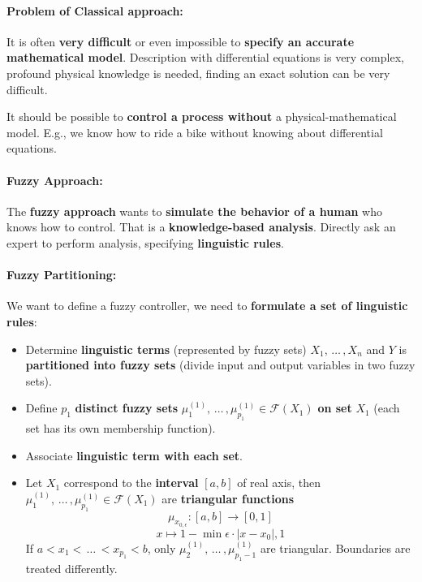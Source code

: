 \paragraph{Problem of Classical approach:} It is often \textbf{very difficult} or even impossible to \textbf{specify an accurate mathematical model}. Description with differential equations is very complex, profound physical knowledge is needed, finding an exact solution can be very difficult.

It should be possible to \textbf{control a process without} a physical-mathematical model. E.g., we know how to ride a bike without knowing about differential equations.\\

\paragraph{Fuzzy Approach:} The \textbf{fuzzy approach} wants to \textbf{simulate the behavior of a human} who knows how to control. That is a \textbf{knowledge-based analysis}. Directly ask an expert to perform analysis, specifying \textbf{linguistic rules}. \\

\paragraph{Fuzzy Partitioning:} We want to define a fuzzy controller, we need to \textbf{formulate a set of linguistic rules}: 
\begin{itemize}
	\item Determine \textbf{linguistic terms} (represented by fuzzy sets) $X_1, \, \dots \, , X_n$ and $Y$ is \textbf{partitioned into fuzzy sets} (divide input and output variables in two fuzzy sets).\\
	
	\item Define $p_1$ \textbf{distinct fuzzy sets} $\mu_1^{(1)}, \, \dots \, , \mu_{p_1}^{(1)} \in \mathcal{F}(X_1)$ \textbf{on set} $X_1$ (each set has its own membership function).\\
	
	\item Associate \textbf{linguistic term with each set}.\\
	
	\item Let $X_1$ correspond to the \textbf{interval} $[a,b]$ of real axis, then $\mu_1^{(1)}, \, \dots \, , \mu_{p_1}^{(1)} \in \mathcal{F} (X_1)$ are \textbf{triangular functions}
	$$ \mu_{x_{0, \epsilon}}: [a,b] \rightarrow [0,1] $$
	$$ x \mapsto 1 - \min {\epsilon \cdot |x - x_0|, 1} $$
	If $a < x_1 < \, \dots \, < x_{p_1} < b$, only $\mu_2^{(1)}, \, \dots \, , \mu_{p_1 - 1}^{(1)}$ are triangular. Boundaries are treated differently.\\
\end{itemize}

